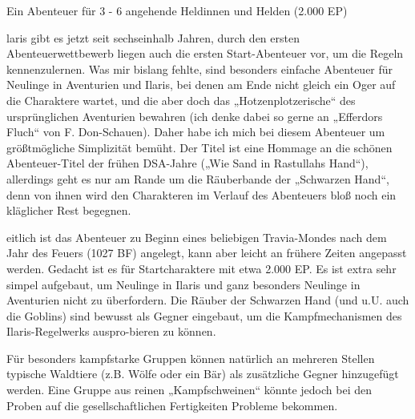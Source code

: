 

\begin{center} 
    Ein Abenteuer für 3 - 6 angehende Heldinnen und Helden (2.000 EP)
\end{center}






laris gibt es jetzt seit sechseinhalb Jahren, durch den ersten Abenteuerwettbewerb
liegen auch die ersten Start-Abenteuer vor, um die Regeln kennenzulernen. Was mir 
bislang fehlte, sind besonders einfache Abenteuer für Neulinge in Aventurien und Ilaris, 
bei denen am Ende nicht gleich ein Oger auf die Charaktere wartet, und die aber doch das 
„Hotzenplotzerische“ des ursprünglichen Aventurien bewahren (ich denke dabei so gerne an
„Efferdors Fluch“ von F. Don-Schauen). Daher habe ich mich bei diesem Abenteuer um
größtmögliche Simplizität bemüht. Der Titel ist eine Hommage an die schönen Abenteuer-Titel 
der frühen DSA-Jahre („Wie Sand in Rastullahs Hand“), allerdings geht es nur am Rande um die 
Räuberbande der „Schwarzen Hand“, denn von ihnen wird den Charakteren im Verlauf des Abenteuers 
bloß noch ein kläglicher Rest begegnen.



eitlich ist das Abenteuer zu Beginn eines beliebigen Travia-Mondes nach dem Jahr des Feuers (1027 BF)
angelegt, kann aber leicht an frühere Zeiten angepasst werden. 
Gedacht ist es für Startcharaktere mit etwa 2.000 EP. 
Es ist extra sehr simpel aufgebaut, um Neulinge in Ilaris und ganz besonders Neulinge in Aventurien 
nicht zu überfordern. Die Räuber der Schwarzen Hand (und u.U. auch die Goblins) sind  bewusst als 
Gegner eingebaut, um die Kampfmechanismen des Ilaris-Regelwerks auspro-bieren zu können. 

Für besonders kampfstarke Gruppen können natürlich an mehreren Stellen typische Waldtiere 
(z.B. Wölfe oder ein Bär) als zusätzliche Gegner hinzugefügt werden. Eine Gruppe aus reinen 
„Kampfschweinen“ könnte jedoch bei den Proben auf die gesellschaftlichen Fertigkeiten Probleme bekommen.

